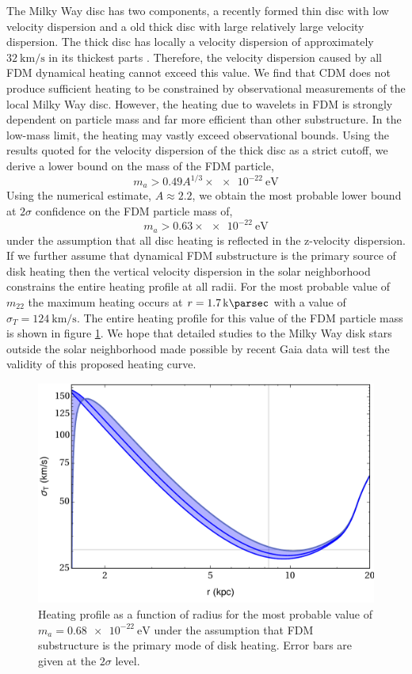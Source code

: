 \documentclass[usenatbib]{mnras}
\begin{document}
The Milky Way disc has two components, a recently formed thin disc with low velocity dispersion and a old thick disc with large relatively large velocity dispersion. The thick disc has locally a velocity dispersion of approximately $\SI{32}{\kilo\meter\per\second}$ in its thickest parts \citep{milky_way}. Therefore, the velocity dispersion caused by all FDM dynamical heating cannot exceed this value. We find that CDM does not produce sufficient heating to be constrained by observational measurements of the local  Milky Way disc. However, the heating due to wavelets in FDM is strongly dependent on particle mass and far more efficient than other substructure. In the low-mass limit, the heating may vastly exceed observational bounds. Using the results quoted for the velocity dispersion of the thick disc as a strict cutoff, we derive a lower bound on the mass of the FDM particle,
\begin{equation}
m_a > 0.49 A^{1/3} \times \SI{e-22}{\electronvolt}
\end{equation}
Using the numerical estimate, $A \approx 2.2$, we obtain the most probable lower bound at $2 \sigma$ confidence on the FDM particle mass of,
\[ m_a > 0.63 \times \SI{e-22}{\electronvolt} \]
under the assumption that all disc heating is reflected in the z-velocity dispersion. If we further assume that dynamical FDM substructure is the primary source of disk heating then the vertical velocity dispersion in the solar neighborhood constrains the entire heating profile at all radii. For the most probable value of $m_{22}$ the maximum heating occurs at $r = \SI{1.7}{\kilo \parsec}$ with a value of $\sigma_{T} = \SI{124}{\kilo\meter\per\second}$. The entire heating profile for this value of the FDM particle mass is shown in figure \ref{fig:heating_shape}. We hope that detailed studies to the Milky Way disk stars outside the solar neighborhood made possible by recent Gaia data will test the validity of this proposed heating curve.   

\begin{figure}
\includegraphics[width=\columnwidth]{heating_shape}
\vspace*{-5mm}
\caption{Heating profile as a function of radius for the most probable value of $m_{a} = \SI{0.68 e-22}{\electronvolt}$ under the assumption that FDM substructure is the primary mode of disk heating. Error bars are given at the $2 \sigma$ level. }
\label{fig:heating_shape}
\end{figure}
\end{document}
